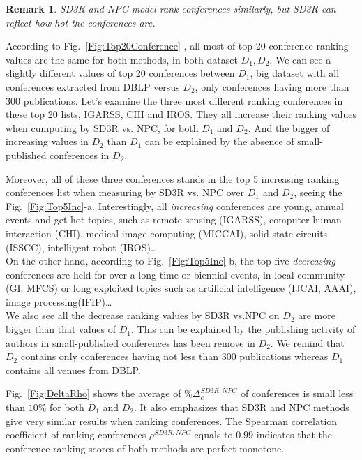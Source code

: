\documentclass[10pt,leqno,twoside]{article}
\newtheorem{remark}{\indent Remark}[section]
\begin{document}
%
\begin{remark}
SD3R and NPC model rank conferences similarly, but SD3R can reflect how hot the conferences are.
\end{remark}

According to Fig.~\ref{Fig:Top20Conference} , all most of top 20 conference ranking values are the same for both methods, in both dataset $D_1, D_2$. We can see a slightly different values of top 20 conferences between $D_1$, big dataset with all conferences extracted from DBLP versus $D_2$, only conferences having more than 300 publications. Let's examine the three most different ranking conferences in these top 20 lists, IGARSS, CHI and IROS. They all increase their ranking values when cumputing by SD3R vs. NPC, for both $D_1$ and $D_2$. And the bigger of increasing values in $D_2$ than $D_1$ can be explained by the absence of small-published conferences in $D_2$. 

Moreover, all of these three conferences stands in the top 5 increasing ranking conferences list when measuring by SD3R vs. NPC over $D_1$ and $D_2$, seeing the Fig.~\ref{Fig:Top5Inc}-a. Interestingly, 
all \textit{increasing} conferences are young, annual events and get hot topics, such as remote sensing (IGARSS), computer human interaction (CHI), medical image computing (MICCAI), solid-state circuits (ISSCC), intelligent robot (IROS)\ldots
\\
On the other hand, according to Fig.~\ref{Fig:Top5Inc}-b, the top five \textit{decreasing} conferences are held for over a long time or biennial events, in local community (GI, MFCS) or long exploited topics such as artificial intelligence (IJCAI, AAAI), image processing(IFIP)\ldots
\\
We also see all the decrease ranking values by SD3R vs.NPC on $D_2$ are more bigger than that values of $D_1$. This can be explained by the publishing activity of authors in small-published conferences has been remove in $D_2$. We remind that $D_2$ contains only conferences having not less than 300 publications whereas $D_1$ contains all venues from DBLP.  

Fig.~\ref{Fig:DeltaRho} shows the average of $\%\Delta^{SD3R, NPC}_c$ of conferences is small less than $10\%$ for both $D_1$ and $D_2$. It also emphasizes that SD3R and NPC methods give very similar results when ranking conferences.
The Spearman correlation coefficient of ranking conferences $\rho^{SD3R,NPC}$ equals to $0.99$ indicates that the conference ranking scores of both methods are perfect monotone.
\end{document}
